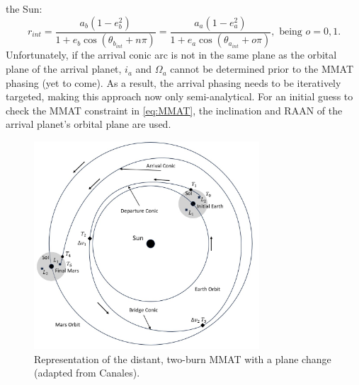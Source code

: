 the Sun:
\begin{equation}
    r_{int}=\frac{a_{b}(1-e_{b}^{2})}{1+e_{b}\cos(\theta_{b_{int}}+n\pi)}=\frac{a_{a}(1-e_{a}^{2})}{1+e_{a}\cos(\theta_{a_{int}}+o\pi)}, \text{ being }o=0,1.
    \label{eq:intersect}
\end{equation}
Unfortunately, if the arrival conic arc is not in the same plane as the orbital plane of the
arrival planet, $i_{a}$ and $\Omega_{a}$ cannot be determined prior to the MMAT phasing (yet to
come). As a result, the arrival phasing needs to be iteratively targeted, making this approach now
only semi-analytical. For an initial guess to check the MMAT constraint in \cref{eq:MMAT}, the
inclination and RAAN of the arrival planet's orbital plane are used.

\begin{figure}[ht]
    \centering
    \includegraphics[width=0.75\textwidth]{figures/MMAT.jpg}
    \caption{Representation of the distant, two-burn MMAT with a plane change (adapted from Canales\cite{Canales:2021b}).}
    \label{fig:MMAT}
\end{figure}

